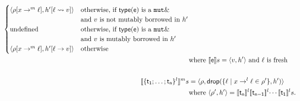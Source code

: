 \begin{definition}
\begin{align*}
\begin{cases}
      \langle\rho[x\to^m\ell],h'[\ell\leadsto v]\rangle & \text{otherwise, if $\type(\mathsf{e})$ is a $\mathtt{mut}\borrow$}\\
                                                        & \text{and $v$ is not mutably borrowed in $h'$}\\
      \text{undefined} & \text{otherwise, if $\type(\mathsf{e})$ is a $\mathtt{mut}\borrow$}\\
                       & \text{and $v$ is mutably borrowed in $h'$}\\
      \langle\rho[x\to^m\ell],h'[\ell\to v]\rangle & \text{otherwise}
    \end{cases}\\
    &\text{where $\den[\mathsf{e}]{s}=\langle v,h'\rangle$ and $\ell$ is fresh}\\
    \mbox{}\\
    \denl[\{\mathsf{t_1};\ldots;\mathsf{t_n}\}^l]{m}{s}&=\langle\rho,\drop(\{\ell\mid x\to^l\ell\in\rho'\},h')\rangle\\
    &\text{where $\langle\rho',h'\rangle=\denl[\mathsf{t_n}]{l}{\denl[\mathsf{t_{n-1}}]{l}{\cdots\denl[\mathsf{t_1}]{l}{s}}}$.}
  \end{align*}
\end{definition}

